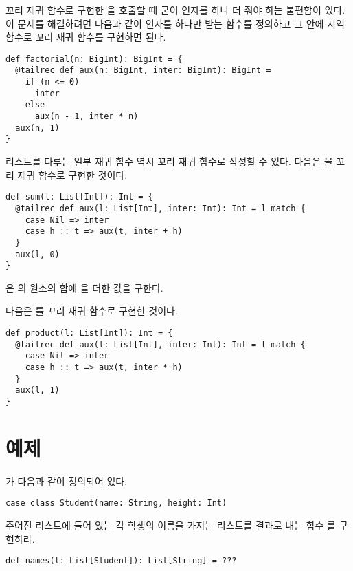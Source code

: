 꼬리 재귀 함수로 구현한 을 호출할 때 굳이 인자를 하나 더 줘야 하는
불편함이 있다. 이 문제를 해결하려면 다음과 같이 인자를 하나만 받는
 함수를 정의하고 그 안에 지역 함수로 꼬리 재귀 함수를 구현하면 된다.

\begin{verbatim}
def factorial(n: BigInt): BigInt = {
  @tailrec def aux(n: BigInt, inter: BigInt): BigInt =
    if (n <= 0)
      inter
    else
      aux(n - 1, inter * n)
  aux(n, 1)
}
\end{verbatim}

리스트를 다루는 일부 재귀 함수 역시 꼬리 재귀 함수로 작성할 수 있다. 다음은
을 꼬리 재귀 함수로 구현한 것이다.

\begin{verbatim}
def sum(l: List[Int]): Int = {
  @tailrec def aux(l: List[Int], inter: Int): Int = l match {
    case Nil => inter
    case h :: t => aux(t, inter + h)
  }
  aux(l, 0)
}
\end{verbatim}

은 의 원소의 합에 을 더한 값을 구한다.

다음은 를 꼬리 재귀 함수로 구현한 것이다.

\begin{verbatim}
def product(l: List[Int]): Int = {
  @tailrec def aux(l: List[Int], inter: Int): Int = l match {
    case Nil => inter
    case h :: t => aux(t, inter * h)
  }
  aux(l, 1)
}
\end{verbatim}

\section{예제}

\begin{exercise}

가 다음과 같이 정의되어 있다.

\begin{verbatim}
case class Student(name: String, height: Int)
\end{verbatim}

주어진 리스트에 들어 있는 각 학생의 이름을 가지는 리스트를 결과로 내는 함수
를 구현하라.

\begin{verbatim}
def names(l: List[Student]): List[String] = ???
\end{verbatim}

\end{exercise}

